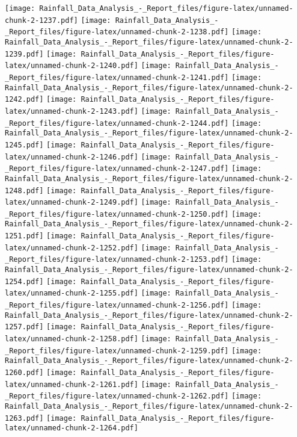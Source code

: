 \documentclass[
]{article}
\begin{document}
\texttt{[image: Rainfall\_Data\_Analysis\_-\_Report\_files/figure-latex/unnamed-chunk-2-1237.pdf]}
\texttt{[image: Rainfall\_Data\_Analysis\_-\_Report\_files/figure-latex/unnamed-chunk-2-1238.pdf]}
\texttt{[image: Rainfall\_Data\_Analysis\_-\_Report\_files/figure-latex/unnamed-chunk-2-1239.pdf]}
\texttt{[image: Rainfall\_Data\_Analysis\_-\_Report\_files/figure-latex/unnamed-chunk-2-1240.pdf]}
\texttt{[image: Rainfall\_Data\_Analysis\_-\_Report\_files/figure-latex/unnamed-chunk-2-1241.pdf]}
\texttt{[image: Rainfall\_Data\_Analysis\_-\_Report\_files/figure-latex/unnamed-chunk-2-1242.pdf]}
\texttt{[image: Rainfall\_Data\_Analysis\_-\_Report\_files/figure-latex/unnamed-chunk-2-1243.pdf]}
\texttt{[image: Rainfall\_Data\_Analysis\_-\_Report\_files/figure-latex/unnamed-chunk-2-1244.pdf]}
\texttt{[image: Rainfall\_Data\_Analysis\_-\_Report\_files/figure-latex/unnamed-chunk-2-1245.pdf]}
\texttt{[image: Rainfall\_Data\_Analysis\_-\_Report\_files/figure-latex/unnamed-chunk-2-1246.pdf]}
\texttt{[image: Rainfall\_Data\_Analysis\_-\_Report\_files/figure-latex/unnamed-chunk-2-1247.pdf]}
\texttt{[image: Rainfall\_Data\_Analysis\_-\_Report\_files/figure-latex/unnamed-chunk-2-1248.pdf]}
\texttt{[image: Rainfall\_Data\_Analysis\_-\_Report\_files/figure-latex/unnamed-chunk-2-1249.pdf]}
\texttt{[image: Rainfall\_Data\_Analysis\_-\_Report\_files/figure-latex/unnamed-chunk-2-1250.pdf]}
\texttt{[image: Rainfall\_Data\_Analysis\_-\_Report\_files/figure-latex/unnamed-chunk-2-1251.pdf]}
\texttt{[image: Rainfall\_Data\_Analysis\_-\_Report\_files/figure-latex/unnamed-chunk-2-1252.pdf]}
\texttt{[image: Rainfall\_Data\_Analysis\_-\_Report\_files/figure-latex/unnamed-chunk-2-1253.pdf]}
\texttt{[image: Rainfall\_Data\_Analysis\_-\_Report\_files/figure-latex/unnamed-chunk-2-1254.pdf]}
\texttt{[image: Rainfall\_Data\_Analysis\_-\_Report\_files/figure-latex/unnamed-chunk-2-1255.pdf]}
\texttt{[image: Rainfall\_Data\_Analysis\_-\_Report\_files/figure-latex/unnamed-chunk-2-1256.pdf]}
\texttt{[image: Rainfall\_Data\_Analysis\_-\_Report\_files/figure-latex/unnamed-chunk-2-1257.pdf]}
\texttt{[image: Rainfall\_Data\_Analysis\_-\_Report\_files/figure-latex/unnamed-chunk-2-1258.pdf]}
\texttt{[image: Rainfall\_Data\_Analysis\_-\_Report\_files/figure-latex/unnamed-chunk-2-1259.pdf]}
\texttt{[image: Rainfall\_Data\_Analysis\_-\_Report\_files/figure-latex/unnamed-chunk-2-1260.pdf]}
\texttt{[image: Rainfall\_Data\_Analysis\_-\_Report\_files/figure-latex/unnamed-chunk-2-1261.pdf]}
\texttt{[image: Rainfall\_Data\_Analysis\_-\_Report\_files/figure-latex/unnamed-chunk-2-1262.pdf]}
\texttt{[image: Rainfall\_Data\_Analysis\_-\_Report\_files/figure-latex/unnamed-chunk-2-1263.pdf]}
\texttt{[image: Rainfall\_Data\_Analysis\_-\_Report\_files/figure-latex/unnamed-chunk-2-1264.pdf]}
\end{document}
